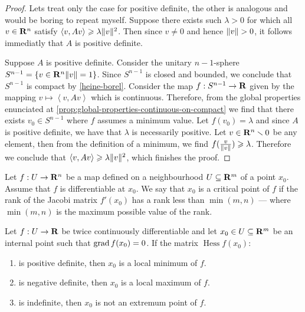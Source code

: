 \begin{proof}
  Lets treat only the case for positive definite, the other is analogous and
  would be boring to repeat myself. Suppose there exists such \(\lambda > 0\) for
  which all \(v \in \mathbf{R}^n\) satisfy \(\left\langle v, Av \right\rangle \geqslant \lambda \lVert v\rVert^2\). Then
  since \(v \neq 0\) and hence \(\lVert v\rVert > 0\), it follows immediatly that \(A\)
  is positive definite.

  Suppose \(A\) is positive definite. Consider the unitary \(n-1\)-sphere
  \(S^{n-1} = \{v \in \mathbf{R}^{n} \relax \lVert v\rVert = 1\}\). Since \(S^{n-1}\) is closed and
  bounded, we conclude that \(S^{n-1}\) is compact by
  \cref{heine-borel}. Consider the map \(f: S^{n-1} \to \mathbf{R}\) given by the mapping
  \(v \mapsto \left\langle v, Av \right\rangle\) which is continuous. Therefore, from the global
  properties enunciated at \cref{prop:global-properties-continuous-on-compact}
  we find that there exists \(v_0 \in S^{n-1}\) where \(f\) assumes a minimum
  value. Let \(f(v_0) = \lambda\) and since \(A\) is positive definite, we have that
  \(\lambda\) is necessarily positive. Let \(v \in \mathbf{R}^n \smallsetminus 0\) be any element, then from
  the definition of a minimum, we find \(f(\frac{v}{\lVert v\rVert}) \geqslant \lambda\). Therefore
  we conclude that \(\left\langle v, Av \right\rangle \geqslant \lambda \lVert v\rVert^2\), which finishes the
  proof.
\end{proof}

\begin{definition}
  \label{def:critical-point}
  Let \(f: U \to \mathbf{R}^n\) be a map defined on a neighbourhood \(U \subseteq \mathbf{R}^m\) of a
  point \(x_0\). Assume that \(f\) is differentiable at \(x_0\). We say that
  \(x_0\) is a critical point of \(f\) if the rank of the Jacobi matrix
  \(f'(x_0)\) has a rank less than \(\min(m, n)\) --- where \(\min(m, n)\) is the
  maximum possible value of the rank.
\end{definition}

\begin{theorem}
  \label{thm:classification-critical-points}
  Let \(f: U \to \mathbf{R}\) be twice continuously differentiable and let \(x_0 \in U \subseteq
  \mathbf{R}^m\) be an internal point such that \(\operatorname{grad} f(x_0) = 0\). If
  the matrix \(\operatorname{Hess} f(x_0)\):
  \begin{enumerate}\setlength\itemsep{0em}
    \item is positive definite, then \(x_0\) is a local
      minimum of \(f\).
    \item is negative definite, then \(x_{0}\) is a local
      maximum of \(f\).
    \item is indefinite, then \(x_0\) is not an extremum point of \(f\).
  \end{enumerate}
\end{theorem}

